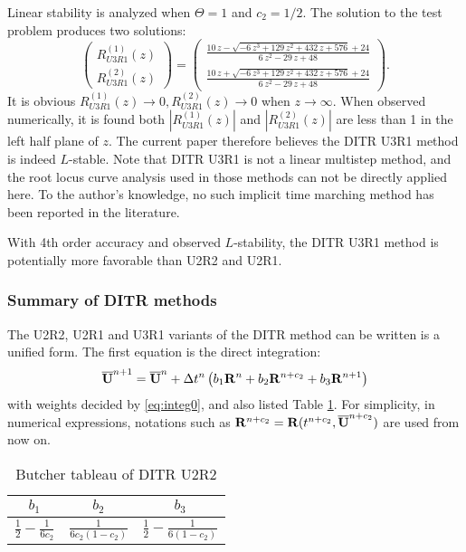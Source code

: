 Linear stability is analyzed when $\Theta =1$ and $c_2 = 1/2$.
The solution to the test problem
produces two solutions:
\begin{equation}
    \left(
    \begin{matrix}
        R_{U3R1}^{(1)}(z) \\
        R_{U3R1}^{(2)}(z)
    \end{matrix}
    \right)=\left(\begin{array}{c} \frac{10\,z-\sqrt{-6\,z^3+129\,z^2+432\,z+576}+24}{6\,z^2-29\,z+48}\\ \frac{10\,z+\sqrt{-6\,z^3+129\,z^2+432\,z+576}+24}{6\,z^2-29\,z+48} \end{array}\right)
    .
\end{equation}
It is obvious $R_{U3R1}^{(1)}(z)\rightarrow 0, R_{U3R1}^{(2)}(z)\rightarrow0$ when
$z\rightarrow\infty$.
When observed numerically, it is found both $|R_{U3R1}^{(1)}(z)|$
and $|R_{U3R1}^{(2)}(z)|$ are less than 1 in the left
half plane of $z$.
The current paper therefore believes %
the DITR U3R1 method is indeed $L$-stable.
Note that DITR U3R1 is not a linear multistep method,
and the root locus curve analysis used in those methods
can not be directly applied here.
To the author's knowledge, no
such implicit time marching method
has been reported in the literature.

With 4th order accuracy and observed $L$-stability, the
DITR U3R1 method is potentially more favorable than
U2R2 and U2R1.

\subsubsection{Summary of DITR methods}
\label{sssec:sumDITRs}

The U2R2, U2R1 and U3R1 variants of the
DITR method can be written is a unified form.
The first equation is the direct integration:
\begin{equation}
    \overline{\mathbf{U}}^{n+1} = \overline{\mathbf{U}}^{n} + \mathrm\Delta t^n\left(
    b_1 \mathbf{R}^n +
    b_2 \mathbf{R}^{n+c_2} +
    b_3 \mathbf{R}^{n+1}
    \right)
    \label{eq:DISum}
\end{equation}
with weights decided by \eqref{eq:integ0},
and also listed Table \ref{tab:integ0Tab}.
For simplicity, in numerical expressions,
notations such as $\mathbf{R}^{n+c_2}=\mathbf{R}(t^{n+c_2}, \overline{\mathbf{U}}^{n+c_2})$
are used from now on.
\begin{table}[htbp]
    \centering
    \begin{tabular}{|c|c|c|}
        \hline
        $b_1$                            & $b_2$ & $b_3$ \\
        \hline
        $\frac{1}{2} - \frac{1}{6{c_2}}$ &
        $\frac{1}{6{c_2}(1-{c_2})}$      &
        $\frac{1}{2} - \frac{1}{6(1-{c_2})} $            \\
        \hline
    \end{tabular}
    \caption{Butcher tableau of DITR U2R2}
    \label{tab:integ0Tab}
\end{table}

